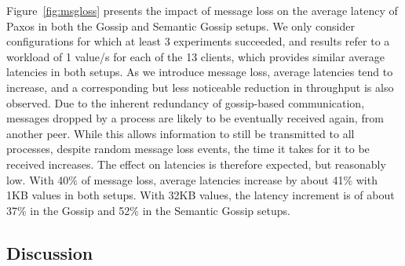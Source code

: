 

Figure~\ref{fig:msgloss} presents the impact of message loss on the average
latency of Paxos in both the Gossip and Semantic Gossip setups.
We only consider configurations for which at least 3 experiments succeeded, and
results refer to a workload of 1 value/s for each of the 13 clients, which
provides similar average latencies in both setups.
%
As we introduce message loss, average latencies tend to increase, and a
corresponding but less noticeable reduction in throughput is also observed.
%
Due to the inherent redundancy of gossip-based communication, messages dropped
by a process are likely to be eventually received again, from another peer.
While this allows information to still be transmitted to all processes, despite
random message loss events, the time it takes for it to be received increases.
The effect on latencies is therefore expected, but reasonably low.
%
With 40\% of message loss, average latencies increase by about 41\% with 1KB
values in both setups.
With 32KB values, the latency increment is of about 37\% in the Gossip and 52\% in
the Semantic Gossip setups.

\subsection{Discussion}

